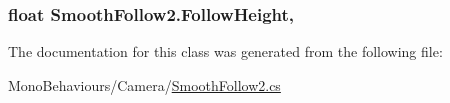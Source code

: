 \subsubsection[{\texorpdfstring{Follow\+Height}{FollowHeight}}]{\setlength{\rightskip}{0pt plus 5cm}float Smooth\+Follow2.\+Follow\+Height\hspace{0.3cm}{\ttfamily [get]}, {\ttfamily [set]}}\hypertarget{class_smooth_follow2_a5c90c3a470073d2bdfd8d6ca6b4e832f}{}\label{class_smooth_follow2_a5c90c3a470073d2bdfd8d6ca6b4e832f}


The documentation for this class was generated from the following file\+:\begin{DoxyCompactItemize}
\item 
Mono\+Behaviours/\+Camera/\hyperlink{_smooth_follow2_8cs}{Smooth\+Follow2.\+cs}\end{DoxyCompactItemize}
